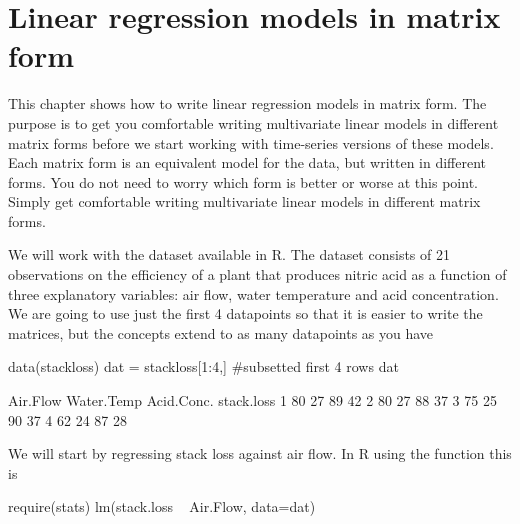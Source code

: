 

\setcounter{MaxMatrixCols}{20}
\usepackage{enumerate}
\usepackage{Sweave}





\chapter{Linear regression models in matrix form}
\label{chap:mlr}

This chapter shows how to write linear regression models in matrix form. The purpose is to get you comfortable writing multivariate linear models in different matrix forms before we start working with time-series versions of these models.  Each matrix form is an equivalent model for the data, but written in different forms.  You do not need to worry which form is better or worse at this point.  Simply get comfortable writing multivariate linear models in different matrix forms.

We will work with the \verb@stackloss@ dataset available in R.  The \verb@stackloss@ dataset consists of 21 observations on the efficiency of a plant that produces nitric acid as a function of three explanatory variables: air flow, water temperature and acid concentration.  We are going to use just the first 4 datapoints so that it is easier to write the matrices, but the concepts extend to as many datapoints as you have
\begin{Schunk}
\begin{Sinput}
 data(stackloss)
 dat = stackloss[1:4,] #subsetted first 4 rows
 dat
\end{Sinput}
\begin{Soutput}
  Air.Flow Water.Temp Acid.Conc. stack.loss
1       80         27         89         42
2       80         27         88         37
3       75         25         90         37
4       62         24         87         28
\end{Soutput}
\end{Schunk}

We will start by regressing stack loss against air flow.  In R using the \verb@lm@ function this is
\begin{Schunk}
\begin{Sinput}
 require(stats)
 lm(stack.loss ~ Air.Flow, data=dat)
\end{Sinput}
\end{Schunk}

